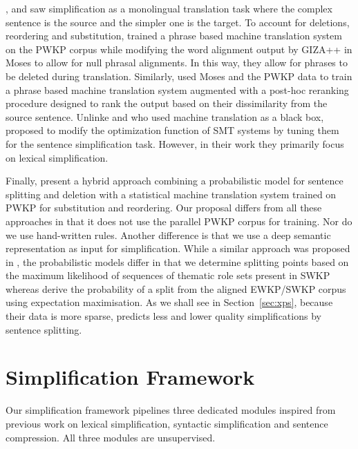 \documentclass[11pt,a4paper]{article}
\begin{document}
,  and
 saw simplification as a monolingual translation
task where the complex sentence is the source and the simpler one is
the target. To account for deletions, reordering and substitution,
 trained a phrase based machine
translation system on the PWKP corpus while modifying the word
alignment output by GIZA++ in Moses to allow for null phrasal
alignments. In this way, they allow for phrases to be deleted during
translation. Similarly,  used Moses and
the PWKP data to train a phrase based machine translation system
augmented with a post-hoc reranking procedure designed to rank the
output based on their dissimilarity from the source sentence. Unlinke
 and  who used
machine translation as a black box,  proposed to
modify the optimization function of SMT systems by tuning them for the
sentence simplification task. However, in their work they primarily
focus on lexical simplification.





Finally,  present a hybrid approach
combining a probabilistic model for sentence splitting and deletion
with a statistical machine translation system trained on PWKP for
substitution and reordering. 
Our proposal differs from all these approaches in that it does not use
the parallel PWKP corpus for training. Nor do we use hand-written
rules. Another difference is that we use a deep semantic
representation as input for simplification. While a similar approach
was proposed in \cite{narayan2014hybrid}, the probabilistic models
differ in that we determine splitting points based on the maximum
likelihood of sequences of thematic role sets present in SWKP whereas
 derive the probability of a split from the
aligned EWKP/SWKP corpus using expectation maximisation. As we shall
see in Section~\ref{sec:xps}, because their data is more sparse,
 predicts less and lower quality
simplifications by sentence splitting.

\section{Simplification Framework}
\label{sec:fwk}

Our simplification framework pipelines three dedicated modules
inspired from previous work on lexical simplification, syntactic
simplification and sentence compression. All three modules are
unsupervised.
\end{document}

